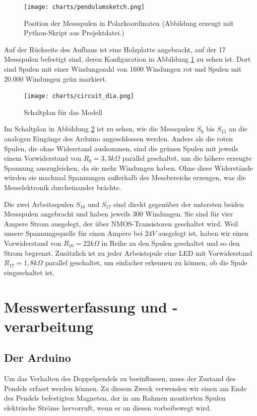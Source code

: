 \begin{figure}[bht]
  \texttt{[image: charts/pendulumsketch.png]}
  \caption{Position der Messspulen in Polarkoordinaten (Abbildung erzeugt mit Python-Skript aus Projektdatei.)}
  \label{fig:pendulumsketch}
\end{figure}

Auf der Rückseite des Aufbaus ist eine Holzplatte angebracht, auf der 17 Messspulen befestigt sind, deren Konfiguration in Abbildung \ref{fig:pendulumsketch} zu sehen ist.
Dort sind Spulen mit einer Windungszahl von 1600 Windungen rot und Spulen mit 20.000 Windungen grün markiert.

\begin{figure}[bht]
  \texttt{[image: charts/circuit\_dia.png]}
  \caption{Schaltplan für das Modell}
  \label{fig:circuit}
\end{figure}

Im Schaltplan in Abbildung \ref{fig:circuit} ist zu sehen, wie die Messspulen $S_0$ bis $S_{15}$ an die analogen Eingänge des Arduino angeschlossen werden.
Anders als die roten Spulen, die ohne Widerstand auskommen, sind die grünen Spulen mit jeweils einem Vorwiderstand von $R_0 = 3,3 k\Omega$ parallel geschaltet, um die höhere erzeugte Spannung auszugleichen, da sie mehr Windungen haben. Ohne diese Widerstände würden sie machmal Spannungen
außerhalb des Messbereichs erzeugen, was die Messelektronik durcheinander brächte.

Die zwei Arbeitsspulen $S_{16}$ und $S_{17}$ sind direkt gegenüber der untersten beiden Messspulen angebracht und haben jeweils 300 Windungen.
Sie sind für vier Ampere Strom ausgelegt, der über NMOS-Transistoren geschaltet wird.
Weil unsere Spannungsquelle für einen Ampere bei $24 V$ ausgelegt ist, haben wir einen Vorwiderstand von $R_{16} = 22 k\Omega$ in Reihe zu den Spulen geschaltet und so den Strom begrenzt.
Zusätzlich ist zu jeder Arbeistspule eine LED mit Vorwiderstand $R_{17} = 1,8 k\Omega$ parallel geschaltet, um einfacher erkennen zu können, ob die Spule eingeschaltet ist.


\section{Messwerterfassung und -verarbeitung}

\subsection{Der Arduino}

Um das Verhalten des Doppelpendels zu beeinflussen, muss der Zustand des Pendels
erfasst werden können. Zu diesem Zweck verwenden wir einen am Ende des Pendels
befestigten Magneten, der in am Rahmen montierten Spulen elektrische Ströme
hervorruft, wenn er an diesen vorbeibewegt wird.

